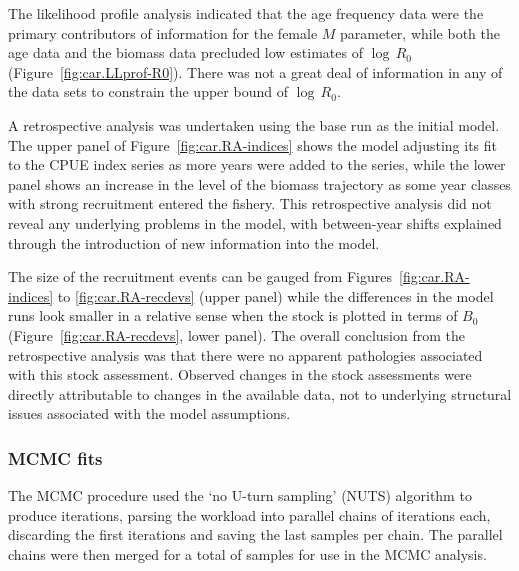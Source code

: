 \documentclass[11pt]{book}
\begin{document}
The likelihood profile analysis indicated that the age frequency data were the primary contributors of information for the female $M$ parameter, while both the age data and the biomass data precluded low estimates of $\log\,R_0$ (Figure~\ref{fig:car.LLprof-R0}).
There was not a great deal of information in any of the data sets to constrain the upper bound of $\log\,R_0$.

A retrospective analysis was undertaken using the base run as the initial model.
The upper panel of Figure~\ref{fig:car.RA-indices} shows the model adjusting its fit to the CPUE index series as more years were added to the series, while the lower panel shows an increase in the level of the biomass trajectory as some year classes with strong recruitment entered the fishery.
This retrospective analysis did not reveal any underlying problems in the model, with between-year shifts explained through the introduction of new information into the model.

The size of the recruitment events can be gauged from Figures~\ref{fig:car.RA-indices} to \ref{fig:car.RA-recdevs} (upper panel) while the differences in the model runs look smaller in a relative sense when the stock is plotted in terms of $B_0$ (Figure~\ref{fig:car.RA-recdevs}, lower panel).
The overall conclusion from the retrospective analysis was that there were no apparent pathologies associated with this stock assessment.
Observed changes in the stock assessments were directly attributable to changes in the available data, not to underlying structural issues associated with the model assumptions.


\graphicspath{{C:/Users/haighr/Files/GFish/PSARC22/CAR/Data/SS/CAR2022/Run24/MPD.24.01/}}
\clearpage

\subsubsection{MCMC fits}\label{sssMCMC}


The MCMC procedure used the `no U-turn sampling' (NUTS) algorithm \citep{Monnahan-Kristensen:2018, Monnahan-etal:2019} to produce \nSimsBase{} iterations, parsing the workload into \nChains{} parallel chains \citep{R:2015_snowfall} of \cSimsBase{} iterations each, discarding the first \cBurnBase{} iterations and saving the last \cSamps{} samples per chain.
The parallel chains were then merged for a total of \Nmcmc{} samples for use in the MCMC analysis.
\end{document}
